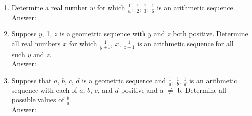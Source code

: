 \documentclass[12pt]{extarticle}
\begin{document}
\begin{enumerate}
{\begin{enumerate}
            \item {Determine a real number $w$ for which $\frac{1}{w}$, $\frac{1}{2}$, $\frac{1}{3}$, $\frac{1}{6}$ is an arithmetic sequence. \\Answer: }
            \item {Suppose $y$, 1, $z$ is a geometric sequence with $y$ and $z$ both positive. Determine all real numbers $x$ for which $\frac{1}{y + 1}$, $x$, $\frac{1}{z + 1}$ is an arithmetic sequence for all such $y$ and $z$. \\Answer: }
            \item {Suppose that $a$, $b$, $c$, $d$ is a geometric sequence and $\frac{1}{a}$, $\frac{1}{b}$, $\frac{1}{d}$ is an arithmetic sequence with each of $a$, $b$, $c$, and $d$ positive and a $\neq$ b. Determine all possible values of $\frac{b}{a}$. \\Answer: }
        \end{enumerate}
    }
\end{enumerate}
\end{document}
